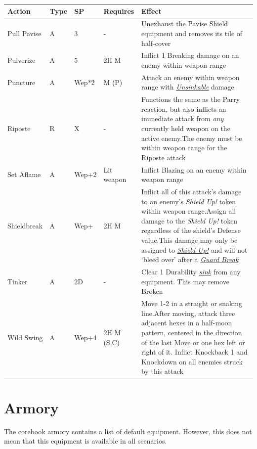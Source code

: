 \documentclass[12pt]{article}
\newcommand{\reftoit}[1]{\hyperlink{#1}{\emph{#1}}}
\begin{document}
\pagebreak

\begin{center}
\begin{tabularx}{\textwidth}{p{}p{}p{}p{}p{}}
\hline
\textbf{Action} & \textbf{Type} & \textbf{SP} & \textbf{Requires} & \textbf{Effect}\\
\hline
Pull Pavise & A & 3 & - & Unexhaust the Pavise Shield equipment and removes its tile of half-cover\\
Pulverize & A & 5 & 2H M & Inflict 1 Breaking damage on an enemy within weapon range \\
Puncture & A & Wep*2 & M (P) & Attack an enemy within weapon range with \reftoit{Unsinkable} damage\\
Riposte & R & X & - & Functions the same as the Parry reaction, but also inflicts an immediate attack from \emph{any} currently held weapon on the active enemy.\newline The enemy must be within weapon range for the Riposte attack\\
Set Aflame & A & Wep+2 & Lit weapon & Inflict Blazing on an enemy within weapon range\\
Shieldbreak & A & Wep+ & 2H M & Inflict all of this attack’s damage to an enemy’s \emph{Shield Up!} token within weapon range.\newline Assign all damage to the \emph{Shield Up!} token regardless of the shield’s Defense value.\newline This damage may only be assigned to \reftoit{Shield Up!} and will not ‘bleed over’ after a \reftoit{Guard Break}\\
Tinker & A & 2D & - & Clear 1 Durability \reftoit{sink} from any equipment. This may remove Broken\\
Wild Swing & A & Wep+4 & 2H M (S,C) & Move 1-2 in a straight or snaking line.\newline After moving, attack three adjacent hexes in a half-moon pattern, centered in the direction of the last Move or one hex left or right of it. Inflict Knockback 1 and Knockdown on all enemies struck by this attack\\
\hline
\end{tabularx}
\end{center}

\pagebreak

\section{Armory}
The corebook armory contains a list of default equipment. However, this does not mean that this equipment is available in all scenarios.
\end{document}
